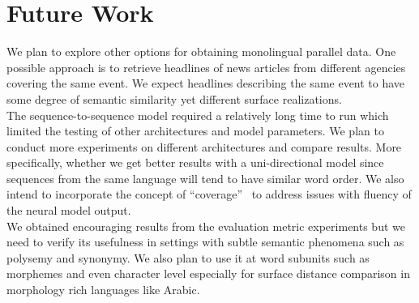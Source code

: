 \documentclass[11pt,letterpaper]{article}
\begin{document}
\section{Future Work}
 We plan to explore other options for obtaining monolingual parallel data. One possible approach is to retrieve headlines of news articles from different agencies covering the same event. We expect headlines describing the same event to have some degree of semantic similarity yet different surface realizations.\\
The sequence-to-sequence model required a relatively long time to run which limited the testing of other architectures and model parameters. We plan to conduct more experiments on different architectures and compare results. More specifically, whether we get better results with a uni-directional model since sequences from the same language will tend to have similar word order. We also intend to incorporate the concept of ``coverage''~\cite{DBLP:journals/corr/MiSWI16} to address issues with fluency of the neural model output.\\ 
We obtained encouraging results from the evaluation metric experiments but we need to verify its usefulness in settings with subtle semantic phenomena such as polysemy and synonymy. We also plan to use it at word subunits such as morphemes and even character level especially for surface distance comparison in morphology rich languages like Arabic. 



\end{document}
